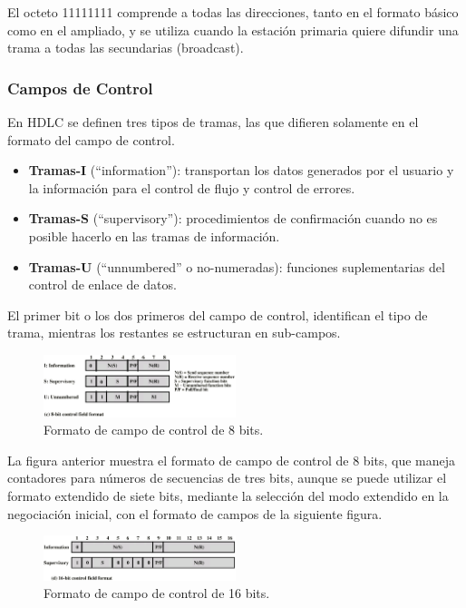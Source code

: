 \documentclass[withindex,glossary]{cam-thesis}
\begin{document}
El octeto 11111111 comprende a todas las direcciones, tanto en el formato básico como en el ampliado, y se utiliza cuando la estación primaria quiere difundir una trama a todas las secundarias (broadcast).

\subsubsection{Campos de Control}
En HDLC se definen tres tipos de tramas, las que difieren solamente en el formato del campo de control.
\begin{itemize}
\item \textbf{Tramas-I} (“information”): transportan los datos generados por el usuario y la información para el control de flujo y control de errores.
\item \textbf{Tramas-S} (“supervisory”): procedimientos de confirmación cuando no es posible hacerlo en las tramas de información.
\item \textbf{Tramas-U} (“unnumbered” o no-numeradas): funciones suplementarias del control de enlace de datos.
\end{itemize}

El primer bit o los dos primeros del campo de control, identifican el tipo de trama, mientras los restantes se estructuran en sub-campos.

\begin{figure}[H]
\centering
\includegraphics[width=0.5\textwidth]{images/HDLC_8BitCtrlField}
\caption[Formato de campo de control de 8 bits]{Formato de campo de control de 8 bits.}
\end{figure}

La figura anterior muestra el formato de campo de control de 8 bits, que maneja contadores para números de secuencias de tres bits, aunque se puede utilizar el formato extendido de siete bits, mediante la selección del modo extendido en la negociación inicial, con el formato de campos de la siguiente figura.

\begin{figure}[H]
\centering
\includegraphics[width=0.5\textwidth]{images/HDLC_16BitCtrlField}
\caption[Formato de campo de control de 16 bits]{Formato de campo de control de 16 bits.}
\end{figure}
\end{document}
